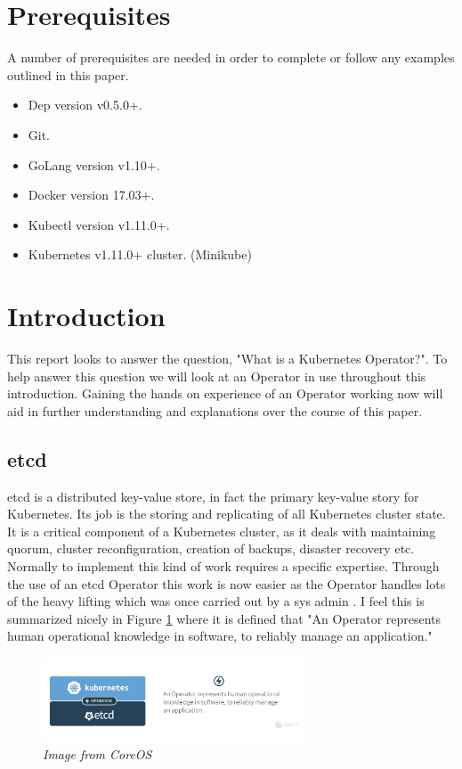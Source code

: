 \section{Prerequisites}
A number of prerequisites are needed in order to complete or follow any examples outlined in this paper.
\begin{itemize}
    \item Dep version v0.5.0+.
    \item Git.
    \item GoLang version v1.10+.
    \item Docker version 17.03+.
    \item Kubectl version v1.11.0+.
    \item Kubernetes v1.11.0+ cluster. (Minikube)
\end{itemize}

\newpage
\section{Introduction}
This report looks to answer the question, "What is a Kubernetes Operator?". To help answer this question we will look at an Operator in use throughout this introduction. Gaining the hands on experience of an Operator working now will aid in further understanding and explanations over the course of this paper.

\subsection{etcd}
\label{sub:etcd}
etcd is a distributed key-value store, in fact the primary key-value story for Kubernetes. Its job is the storing and replicating of all Kubernetes cluster state. It is a critical component of a Kubernetes cluster, as it deals with maintaining quorum, cluster reconfiguration, creation of backups, disaster recovery etc. Normally to implement this kind of work requires a specific expertise. Through the use of an etcd Operator this work is now easier as the Operator handles lots of the heavy lifting which was once carried out by a sys admin \citep{coreos}. I feel this is summarized nicely in Figure \ref{img:op_def} where it is defined that "An Operator represents human operational knowledge in software, to reliably manage an application."

\begin{figure}[!ht]
\centering
\includegraphics*[width=0.7\textwidth]{images/op1.png}
\caption{\em Image from CoreOS}
\label{img:op_def}
\end{figure}

